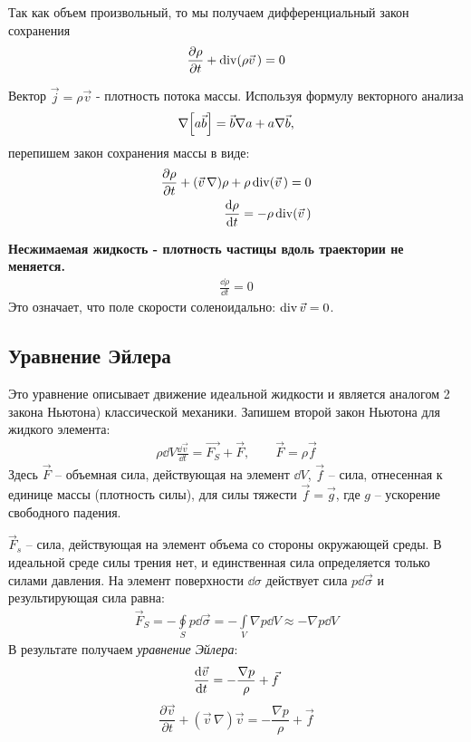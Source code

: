 Так как объем произвольный, то мы получаем дифференциальный закон сохранения
\begin{align*} 
\frac{\partial \rho}{\partial t}+\operatorname{div}(\rho \vec{v}\,)=0
\end{align*}

Вектор $ \vec{j}=\rho \vec{v} $ - плотность потока массы. Используя формулу векторного анализа
\begin{equation}
	\nabla\qty[a \vec{b}]=\vec{b} \nabla a +a \nabla \vec{b},
\end{equation}
перепишем закон сохранения массы в виде:
\begin{align*} 
\frac{\partial \rho}{\partial t}+(\vec{v}\,\nabla) \rho+\rho \operatorname{div}(\vec{v}\,)=0 \\
\frac{\dd \rho}{\dd t}=-\rho \operatorname{div}(\vec{v}\,)
\end{align*}

\textbf{Несжимаемая жидкость - плотность частицы вдоль траектории  не меняется.}
\begin{align*} 
\frac{\dd \rho}{\dd t}=0
\end{align*}
Это означает, что поле скорости соленоидально: $\operatorname{div}\vec{v}=0$.

\subsection{Уравнение Эйлера}
Это уравнение описывает движение идеальной жидкости и является аналогом {2 закона Ньютона}) классической механики. Запишем второй закон Ньютона для жидкого элемента:
\begin{align*}
\rho\dd{V} \frac{\dd \vec{v}}{\dd t} =\vec{F_{S}}+\vec{F}, \qquad
\vec { F } = \rho \vec { f }
\end{align*}
Здесь $\vec{F}$ --  объемная сила, действующая на элемент $\dd V$, $\vec{f}$ -- сила, отнесенная к единице массы (плотность силы), для силы тяжести $\vec{f}=\vec{g}$, где $g$ -- ускорение свободного падения.

$\vec{F}_s$ -- сила, действующая на элемент объема со стороны окружающей среды.  В идеальной среде силы трения нет, и единственная сила определяется только силами давления. На элемент поверхности $\dd\sigma$ действует сила $ p \dd{\vec{\sigma}} $ и результирующая сила равна:
\begin{align*}
\vec { F } _ { S } = - \oint \limits_ { S } p \dd{\vec{\sigma}} = - \int \limits_ { V } \nabla p\dd{V} \approx - \nabla p\dd{V}
\end{align*}
В результате получаем \textit{уравнение Эйлера}:
\begin{align*}
\dv{\vec{v}}{t} = - \frac { \nabla p } { \rho } + \vec { f }
\end{align*}
\begin{equation}
\frac { \partial \vec { v } } { \partial t } + ( \vec{v}\,\nabla ) \vec { v }  =	- \frac { \nabla p } { \rho } + \vec { f }
\end{equation}

